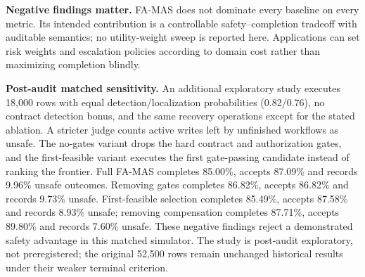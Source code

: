 \documentclass[10pt,journal,compsoc]{IEEEtran}
\newcommand{\famas}{FA-MAS}
\begin{document}
\textbf{Negative findings matter.} \famas{} does not dominate every baseline on every metric. Its intended contribution is a controllable safety--completion tradeoff with auditable semantics; no utility-weight sweep is reported here. Applications can set risk weights and escalation policies according to domain cost rather than maximizing completion blindly.

\textbf{Post-audit matched sensitivity.} An additional exploratory study executes 18,000 rows with equal detection/localization probabilities (0.82/0.76), no contract detection bonus, and the same recovery operations except for the stated ablation. A stricter judge counts active writes left by unfinished workflows as unsafe. The no-gates variant drops the hard contract and authorization gates, and the first-feasible variant executes the first gate-passing candidate instead of ranking the frontier. Full \famas{} completes 85.00\%, accepts 87.09\% and records 9.96\% unsafe outcomes. Removing gates completes 86.82\%, accepts 86.82\% and records 9.73\% unsafe. First-feasible selection completes 85.49\%, accepts 87.58\% and records 8.93\% unsafe; removing compensation completes 87.71\%, accepts 89.80\% and records 7.60\% unsafe. These negative findings reject a demonstrated safety advantage in this matched simulator. The study is post-audit exploratory, not preregistered; the original 52,500 rows remain unchanged historical results under their weaker terminal criterion.
\end{document}
